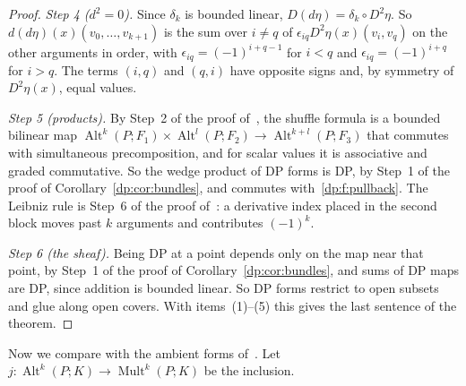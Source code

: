 \documentclass[11pt]{amsart}
\theoremstyle{definition}
\theoremstyle{remark}
\numberwithin{equation}{section}
\newcommand{\Alt}{\operatorname{Alt}}
\newcommand{\Mult}{\operatorname{Mult}}
\theoremstyle{plain}
\theoremstyle{definition}
\theoremstyle{plain}
\begin{document}
\begin{proof}
\emph{Step 4 ($d^2=0$).} Since $\delta_k$ is bounded linear, $D(d\eta)=\delta_k\circ D^2\eta$. So $d(d\eta)(x)(v_0,\dots,v_{k+1})$ is the sum over $i\ne q$ of $\epsilon_{iq}D^2\eta(x)(v_i,v_q)$ on the other arguments in order, with $\epsilon_{iq}=(-1)^{i+q-1}$ for $i<q$ and $\epsilon_{iq}=(-1)^{i+q}$ for $i>q$. The terms $(i,q)$ and $(q,i)$ have opposite signs and, by symmetry of $D^2\eta(x)$, equal values.

\emph{Step 5 (products).} By Step~2 of the proof of~\cite[Theorem~10.7]{I}, the shuffle formula is a bounded bilinear map $\Alt^k(P;F_1)\times\Alt^l(P;F_2)\to\Alt^{k+l}(P;F_3)$ that commutes with simultaneous precomposition, and for scalar values it is associative and graded commutative. So the wedge product of DP forms is DP, by Step~1 of the proof of Corollary~\ref{dp:cor:bundles}, and commutes with~\eqref{dp:f:pullback}. The Leibniz rule is Step~6 of the proof of~\cite[Theorem~10.7]{I}: a derivative index placed in the second block moves past $k$ arguments and contributes $(-1)^k$.

\emph{Step 6 (the sheaf).} Being DP at a point depends only on the map near that point, by Step~1 of the proof of Corollary~\ref{dp:cor:bundles}, and sums of DP maps are DP, since addition is bounded linear. So DP forms restrict to open subsets and glue along open covers. With items~(1)--(5) this gives the last sentence of the theorem.
\end{proof}

Now we compare with the ambient forms of~\cite[Section~10.3]{I}. Let $j\colon\Alt^k(P;K)\to\Mult^k(P;K)$ be the inclusion.
\end{document}
